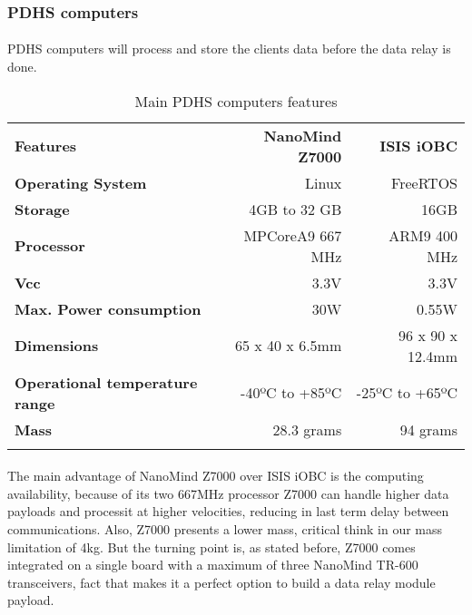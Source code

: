 \subsubsection{PDHS computers}
\paragraph{}PDHS computers will process and store the clients data before the data relay is done.
\pagebreak

\begin{longtable}{| l | r | r |}
	
	\hline
	\rowcolor[gray]{0.60} \multicolumn{3}{|c|}{\textbf{PDHS computers options}}\\
	\hline
		
	\hline
	\rowcolor[gray]{0.75}	\textbf{Features} &  \textbf{NanoMind Z7000} & \textbf{ISIS iOBC} \\
	\hline
		
	\cellcolor[gray]{0.85} \textbf{Operating System} & Linux  & FreeRTOS\\
	\cellcolor[gray]{0.85} \textbf{Storage} & 4GB to 32 GB& 16GB\\
	\cellcolor[gray]{0.85} \textbf{Processor} & MPCoreA9 667 MHz& ARM9 400 MHz\\
	\cellcolor[gray]{0.85} \textbf{Vcc} & 3.3V&3.3V \\
	\cellcolor[gray]{0.85} \textbf{Max. Power consumption} & 30W& 0.55W\\
	\cellcolor[gray]{0.85} \textbf{Dimensions} & 65 x 40 x 6.5mm & 96 x 90 x 12.4mm\\
	\cellcolor[gray]{0.85} \textbf{Operational temperature range} & -40ºC to +85ºC & -25ºC to +65ºC\\
	\cellcolor[gray]{0.85} \textbf{Mass} & 28.3 grams&94 grams \\
	\hline
		
\caption{Main PDHS computers features}
\label{computers}	
\end{longtable}

\paragraph{}The main advantage of NanoMind Z7000 over ISIS iOBC is the computing availability, because of its two 667MHz processor Z7000 can handle higher data payloads and processit at higher velocities, reducing in last term delay between communications. Also, Z7000 presents a lower mass, critical think in our mass limitation of 4kg. But the turning point is, as stated before, Z7000 comes integrated on a single board with a maximum of three NanoMind TR-600 transceivers, fact that makes it a perfect option to build a data relay module payload.
